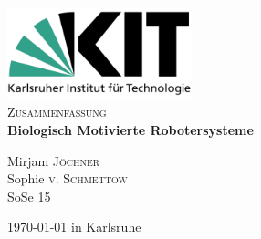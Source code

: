 \documentclass[11pt]{scrartcl}
\begin{document}
\begin{titlepage}

\begin{center}


\includegraphics[width=0.4\textwidth]{Logo_KIT.png}\\[1cm]    



\textsc{\Large Zusammenfassung}\\[0.5cm]


{ \huge \bfseries Biologisch Motivierte Robotersysteme}\\[0.4cm]
\bigskip

Mirjam \textsc{Jöchner}\\
Sophie \textsc{v. Schmettow}\\
SoSe 15\\




\vfill

{\large \today{} in Karlsruhe} 

\end{center}


\end{titlepage}


\tableofcontents
\newpage


\end{document}
